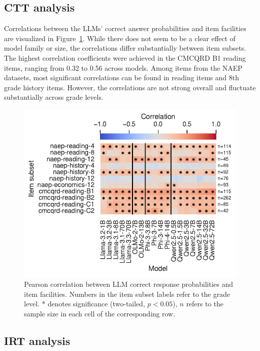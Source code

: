 \documentclass[11pt]{article}
\begin{document}
\subsection{CTT analysis}

Correlations between the LLMs' correct answer probabilities and item facilities are visualized in Figure~\ref{fig:ctt-correlation}. While there does not seem to be a clear effect of model family or size, the correlations differ substantially between item subsets. The highest correlation coefficients were achieved in the CMCQRD B1 reading items, ranging from 0.32 to 0.56 across models. Among items from the NAEP datasets, most significant correlations can be found in reading items and 8th grade history items. However, the correlations are not strong overall and fluctuate substantially across grade levels.

\begin{figure}
  \centering
  \includegraphics[width=\columnwidth]{figures/ctt-correlation.pdf}
  \caption{Pearson correlation between LLM correct response probabilities and item facilities. Numbers in the item subset labels refer to the grade level. $*$ denotes significance (two-tailed, $p < 0.05$), $n$ refers to the sample size in each cell of the corresponding row.}
  \label{fig:ctt-correlation}
\end{figure}

\subsection{IRT analysis}
\end{document}
